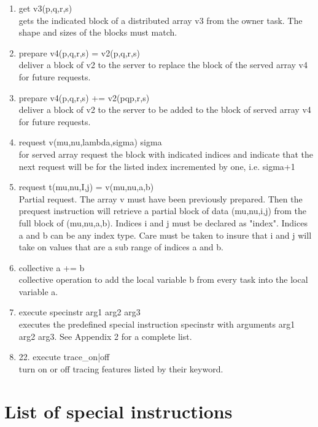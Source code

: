 \documentclass[12pt]{article}
\begin{document}
\begin{enumerate}
\item get v3(p,q,r,s)\\ 
gets the indicated block of a distributed array v3 from the owner task. The shape and sizes 
of the blocks must match.

\item prepare v4(p,q,r,s) = v2(p,q,r,s)\\ 
deliver a block of v2 to the server to replace the block of the served array v4 for future 
requests.

\item prepare v4(p,q,r,s) += v2(pqp,r,s)\\ 
deliver a block of v2 to the server to be added to the block of served array v4 for future 
requests.

\item request v(mu,nu,lambda,sigma) sigma\\ 
for served array request the block with indicated indices and indicate that the next request 
will be for the listed index incremented by one, i.e. sigma+1

\item request t(mu,nu,I,j) = v(mu,nu,a,b)\\ 
Partial request. The array v must have been previously prepared. Then the prequest instruction 
will retrieve a partial block of data (mu,nu,i,j) from the full block of (mu,nu,a,b). 
Indices i and j must be declared as "index". Indices a and b can be any index type. 
Care must be taken to insure that i and j will take on values that are a sub range of 
indices a and b.

\item collective a += b\\ 
collective operation to add the local variable b from every task into the local variable a.

\item execute specinstr arg1 arg2 arg3\\ 
executes the predefined special instruction specinstr with arguments arg1 arg2 arg3. 
See Appendix 2 for a complete list.

\item 22. execute trace\_on|off\\ 
turn on or off tracing features listed by their keyword.

\end{enumerate} 



\section{List of special instructions}
\label{sect:list}
\end{document}

